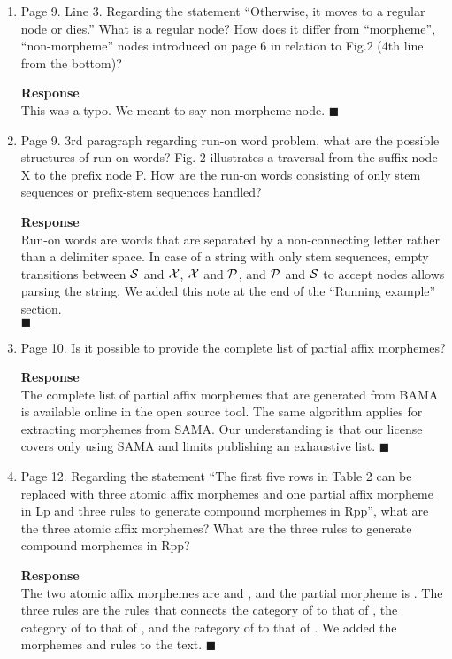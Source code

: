 \begin{enumerate}[leftmargin=0mm,label=\bfseries CommentR1.\arabic*]
\item\label{Review.1.6}
Page 9.  Line 3. Regarding the statement ``Otherwise, it moves to a regular node or dies.'' 
What is a regular node? How does it differ from “morpheme”, “non-morpheme” nodes introduced 
on page 6 in relation to Fig.2 (4th line from the bottom)?

\textbf{Response}\\
This was a typo. We meant to say non-morpheme node.
$\blacksquare$

\item\label{Review.1.7}
Page 9. 3rd paragraph regarding run-on word problem, what are the possible structures of run-on words? 
Fig. 2 illustrates a traversal from the suffix node X to the prefix node P. 
How are the run-on words consisting of only stem sequences or prefix-stem sequences handled?

\textbf{Response}\\
Run-on words are words that are separated by a non-connecting letter rather than a delimiter space. 
In case of a string with only stem sequences, empty transitions between 
${\cal S}$ and ${\cal X}$, ${\cal X}$ and ${\cal P}$, and ${\cal P}$ and ${\cal S}$ to accept nodes allows parsing the string. 
We added this note at the end of the ``Running example'' section. \\
$\blacksquare$

\item\label{Review.1.8}
Page 10. Is it possible to provide the complete list of partial affix morphemes?

\textbf{Response}\\
The complete list of partial affix morphemes that are generated from BAMA is available online in the open source tool. 
The same algorithm applies for extracting morphemes from SAMA.  
Our understanding is that our license covers only
using SAMA and limits publishing an exhaustive list. 
$\blacksquare$

\item\label{Review.1.9}
Page 12.  Regarding the statement ``The first five rows in Table 2 can be replaced with three atomic affix morphemes and one partial affix morpheme in Lp and three rules to generate compound morphemes in Rpp'',  what are the three atomic affix morphemes? What are the three rules to generate  compound morphemes in Rpp?

\textbf{Response}\\
The two atomic affix morphemes are  and , and the partial morpheme is . The three rules are the rules that connects the category of  to that of , the category of  to that of , and the category of  to that of . We added the morphemes and rules to the text.
$\blacksquare$


\end{enumerate}
